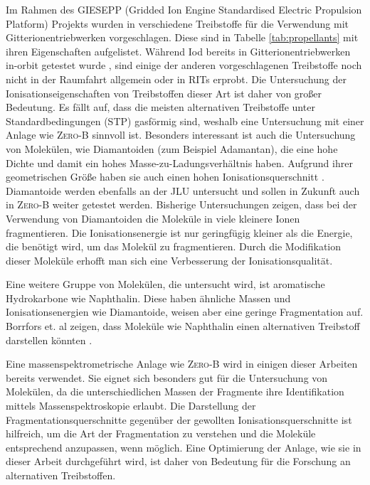 Im Rahmen des GIESEPP (Gridded Ion Engine Standardised Electric Propulsion Platform) Projekts wurden in \cite{Prop} verschiedene Treibstoffe für die Verwendung mit Gitterionentriebwerken vorgeschlagen. Diese sind in Tabelle \ref{tab:propellants} mit ihren Eigenschaften aufgelistet. Während Iod bereits in Gitterionentriebwerken in-orbit getestet wurde \cite{Iodine}, sind einige der anderen vorgeschlagenen Treibstoffe noch nicht in der Raumfahrt allgemein oder in RITs erprobt. Die Untersuchung der Ionisationseigenschaften von Treibstoffen dieser Art ist daher von großer Bedeutung. Es fällt auf, dass die meisten alternativen Treibstoffe unter Standardbedingungen (STP) gasförmig sind, weshalb eine Untersuchung mit einer Anlage wie \textsc{Zero-B} sinnvoll ist. Besonders interessant ist auch die Untersuchung von Molekülen, wie Diamantoiden (zum Beispiel Adamantan), die eine hohe Dichte und damit ein hohes Masse-zu-Ladungsverhältnis haben. Aufgrund ihrer geometrischen Größe haben sie auch einen hohen Ionisationsquerschnitt \cite{ion}. Diamantoide werden ebenfalls an der JLU untersucht \cite{diamondoids} und sollen in Zukunft auch in \textsc{Zero-B} weiter getestet werden. Bisherige Untersuchungen zeigen, dass bei der Verwendung von Diamantoiden die Moleküle in viele kleinere Ionen fragmentieren. Die Ionisationsenergie ist nur geringfügig kleiner als die Energie, die benötigt wird, um das Molekül zu fragmentieren. Durch die Modifikation dieser Moleküle erhofft man sich eine Verbesserung der Ionisationsqualität. 

Eine weitere Gruppe von Molekülen, die untersucht wird, ist aromatische Hydrokarbone wie Naphthalin. Diese haben ähnliche Massen und Ionisationsenergien wie Diamantoide, weisen aber eine geringe Fragmentation auf. Borrfors et. al zeigen, dass Moleküle wie Naphthalin einen alternativen Treibstoff darstellen könnten \cite{hydrocarbons}.

Eine massenspektrometrische Anlage wie \textsc{Zero-B} wird in einigen dieser Arbeiten bereits verwendet. Sie eignet sich besonders gut für die Untersuchung von Molekülen, da die unterschiedlichen Massen der Fragmente ihre Identifikation mittels Massenspektroskopie erlaubt. Die Darstellung der Fragmentationsquerschnitte gegenüber der gewollten Ionisationsquerschnitte ist hilfreich, um die Art der Fragmentation zu verstehen und die Moleküle entsprechend anzupassen, wenn möglich. Eine Optimierung der Anlage, wie sie in dieser Arbeit durchgeführt wird, ist daher von Bedeutung für die Forschung an alternativen Treibstoffen.

